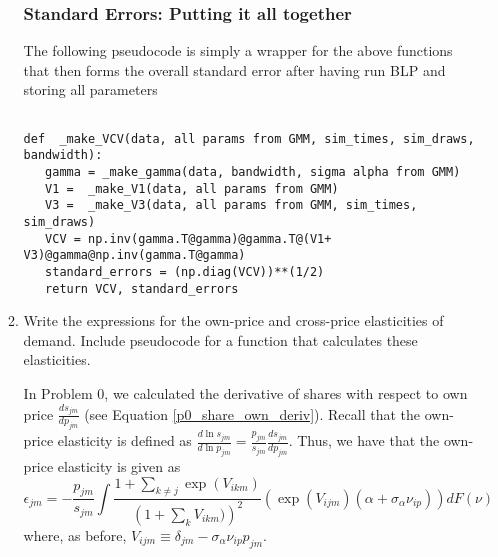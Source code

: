 \documentclass{article}
\begin{document}
\begin{enumerate}
\begin{enumerate}
\begin{answer}
\subsubsection*{Standard Errors: Putting it all together}
The following pseudocode is simply a wrapper for the above functions that then forms the overall standard error after having run BLP and storing all parameters
\begin{verbatim}

def  _make_VCV(data, all params from GMM, sim_times, sim_draws, bandwidth):
   gamma = _make_gamma(data, bandwidth, sigma alpha from GMM)
   V1 =  _make_V1(data, all params from GMM)
   V3 =  _make_V3(data, all params from GMM, sim_times, sim_draws)
   VCV = np.inv(gamma.T@gamma)@gamma.T@(V1+ V3)@gamma@np.inv(gamma.T@gamma)
   standard_errors = (np.diag(VCV))**(1/2)
   return VCV, standard_errors
 \end{verbatim}
 
\end{answer}


\item Write the expressions for the own-price and cross-price elasticities of demand. Include pseudocode for a function that calculates these elasticities.

\begin{answer}
In Problem 0, we calculated the derivative of shares with respect to own price $\frac{d s_{jm}}{d p_{jm}}$ (see Equation \ref{p0_share_own_deriv}). Recall that the own-price elasticity is defined as $\frac{d \ln s_{jm}}{d \ln p_{jm}} = \frac{p_{jm}}{s_{jm}}\frac{d s_{jm}}{d p_{jm}}$. Thus, we have that the own-price elasticity is given as 
\begin{equation}\label{p1_elas_own_price}
    \epsilon_{jm} = -\frac{p_{jm}}{s_{jm}}
    \int \frac{1 + \sum_{k \neq j} \exp(V_{ikm})}{\left(1 + \sum_{k} V_{ikm})\right)^2} \left(\exp(V_{ijm}) (\alpha + \sigma_\alpha \nu_{ip})\right) d F(\nu)
\end{equation}
where, as before, $V_{ijm} \equiv \delta_{jm} - \sigma_\alpha \nu_{ip} p_{jm}$. 


\end{answer}
\end{enumerate}
\end{enumerate}
\end{document}
